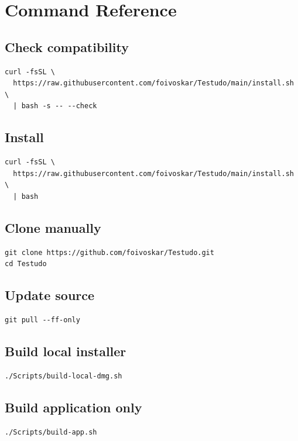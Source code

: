 \documentclass{testudomanual}
\begin{document}
\appendix

\chapter{Command Reference}

\section{Check compatibility}
\begin{lstlisting}
curl -fsSL \
  https://raw.githubusercontent.com/foivoskar/Testudo/main/install.sh \
  | bash -s -- --check
\end{lstlisting}

\section{Install}
\begin{lstlisting}
curl -fsSL \
  https://raw.githubusercontent.com/foivoskar/Testudo/main/install.sh \
  | bash
\end{lstlisting}

\section{Clone manually}
\begin{lstlisting}
git clone https://github.com/foivoskar/Testudo.git
cd Testudo
\end{lstlisting}

\section{Update source}
\begin{lstlisting}
git pull --ff-only
\end{lstlisting}

\section{Build local installer}
\begin{lstlisting}
./Scripts/build-local-dmg.sh
\end{lstlisting}

\section{Build application only}
\begin{lstlisting}
./Scripts/build-app.sh
\end{lstlisting}
\end{document}
